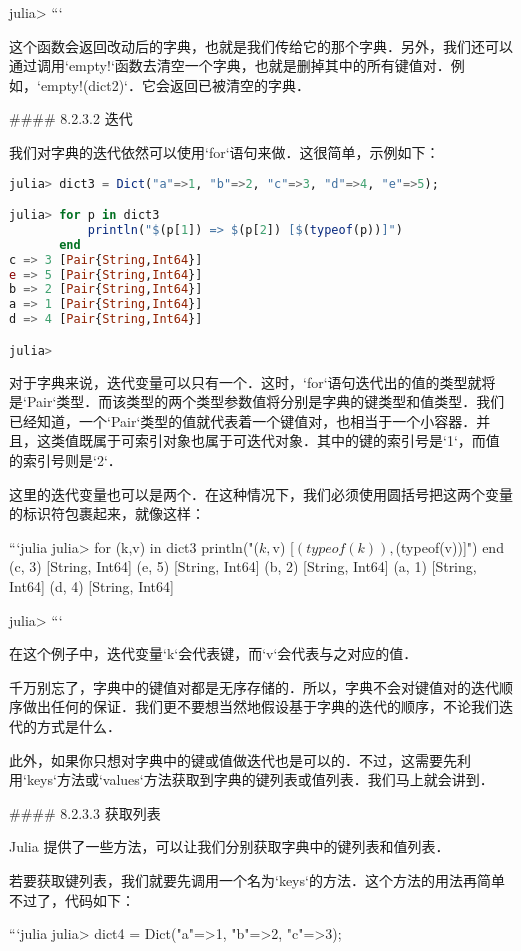 julia> 
```

这个函数会返回改动后的字典，也就是我们传给它的那个字典．另外，我们还可以通过调用`empty!`函数去清空一个字典，也就是删掉其中的所有键值对．例如，`empty!(dict2)`．它会返回已被清空的字典．

#### 8.2.3.2 迭代

我们对字典的迭代依然可以使用`for`语句来做．这很简单，示例如下：
\begin{lstlisting}[language=julia]
julia> dict3 = Dict("a"=>1, "b"=>2, "c"=>3, "d"=>4, "e"=>5);

julia> for p in dict3
           println("$(p[1]) => $(p[2]) [$(typeof(p))]")
       end
c => 3 [Pair{String,Int64}]
e => 5 [Pair{String,Int64}]
b => 2 [Pair{String,Int64}]
a => 1 [Pair{String,Int64}]
d => 4 [Pair{String,Int64}]

julia> 
\end{lstlisting}

对于字典来说，迭代变量可以只有一个．这时，`for`语句迭代出的值的类型就将是`Pair`类型．而该类型的两个类型参数值将分别是字典的键类型和值类型．我们已经知道，一个`Pair`类型的值就代表着一个键值对，也相当于一个小容器．并且，这类值既属于可索引对象也属于可迭代对象．其中的键的索引号是`1`，而值的索引号则是`2`．

这里的迭代变量也可以是两个．在这种情况下，我们必须使用圆括号把这两个变量的标识符包裹起来，就像这样：

```julia
julia> for (k,v) in dict3
           println("($k, $v) [$(typeof(k)), $(typeof(v))]")
       end
(c, 3) [String, Int64]
(e, 5) [String, Int64]
(b, 2) [String, Int64]
(a, 1) [String, Int64]
(d, 4) [String, Int64]

julia> 
```

在这个例子中，迭代变量`k`会代表键，而`v`会代表与之对应的值．

千万别忘了，字典中的键值对都是无序存储的．所以，字典不会对键值对的迭代顺序做出任何的保证．我们更不要想当然地假设基于字典的迭代的顺序，不论我们迭代的方式是什么．

此外，如果你只想对字典中的键或值做迭代也是可以的．不过，这需要先利用`keys`方法或`values`方法获取到字典的键列表或值列表．我们马上就会讲到．

#### 8.2.3.3 获取列表

Julia 提供了一些方法，可以让我们分别获取字典中的键列表和值列表．

若要获取键列表，我们就要先调用一个名为`keys`的方法．这个方法的用法再简单不过了，代码如下：

```julia
julia> dict4 = Dict("a"=>1, "b"=>2, "c"=>3);

